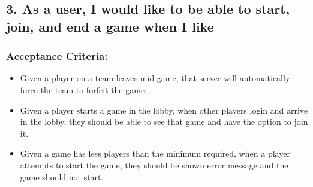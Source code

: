 \subsection*{3. As a user, I would like to be able to start, join, and end a game when I like}


\subsubsection*{Acceptance Criteria:}

\begin{itemize}
\item Given a player on a team leaves mid-game, that server will automatically force the team to forfeit the game.
\item Given a player starts a game in the lobby, when other players login and arrive in the lobby, they should be able to see that game and have the option to join it.
\item Given a game has less players than the minimum required, when a player attempts to start the game, they should be shown error message and the game should not start.
\end{itemize}
